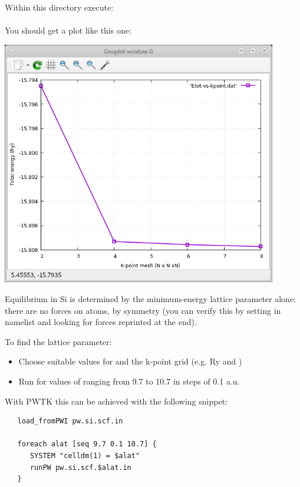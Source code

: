 \documentclass[landscape]{foils}
\begin{document}
Within this directory execute:\\[0.5em]
\indent\prompt{}\\[0.5em]
You should get a plot like this one:\\[-3cm]
\begin{flushright}
  \includegraphics[width=12cm]{figs/etot-vs-kpoints.png}
\end{flushright}

%
Equilibrium in Si is determined by the minimum-energy lattice
parameter alone: there are no forces on atoms, by symmetry (you can
verify this by setting  in namelist
 and looking for forces reprinted at the end).

To find the lattice parameter:
\begin{itemize}
\item Choose suitable values for  and the k-point 
grid {\small (e.g.  Ry and )}
\item Run  for values of  ranging from
  9.7 to 10.7 in steps of 0.1 a.u.
\end{itemize}

With PWTK this can be achieved with the following snippet:
{\codecolor
\begin{verbatim}
   load_fromPWI pw.si.scf.in

   foreach alat [seq 9.7 0.1 10.7] {
      SYSTEM "celldm(1) = $alat"
      runPW pw.si.scf.$alat.in
   }
\end{verbatim}
}
\end{document}
